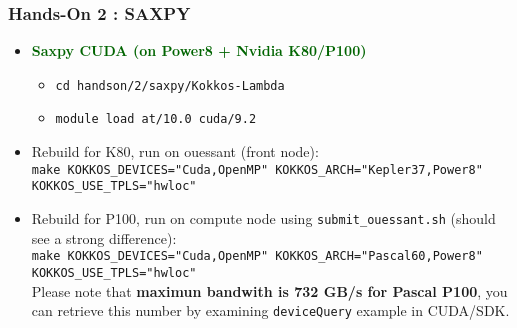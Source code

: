\begin{frame}[fragile=singleslide]
  \frametitle{Hands-On 2 : SAXPY}

  \begin{itemize}
  \item \textcolor{darkgreen}{\textbf{Saxpy CUDA (on Power8 + Nvidia K80/P100)}}
    \begin{itemize}
    \item \texttt{cd handson/2/saxpy/Kokkos-Lambda}
    \item \texttt{module load at/10.0 cuda/9.2}
    \end{itemize}
  \item Rebuild for K80, run on ouessant (front node):\\
    \texttt{make KOKKOS\_DEVICES="Cuda,OpenMP" KOKKOS\_ARCH="Kepler37,Power8" KOKKOS\_USE\_TPLS="hwloc"}
  \item Rebuild for P100, run on compute node using \texttt{submit\_ouessant.sh} (should see a strong difference):\\
    \texttt{make KOKKOS\_DEVICES="Cuda,OpenMP" KOKKOS\_ARCH="Pascal60,Power8" KOKKOS\_USE\_TPLS="hwloc"}\\
    Please note that \textbf{maximun bandwith is 732 GB/s for Pascal P100}, you can retrieve this number by examining \texttt{deviceQuery} example in CUDA/SDK.
  \end{itemize}
\end{frame}

